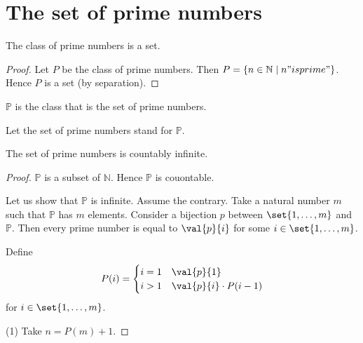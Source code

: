 \documentclass[../../basic-notions.ftl.tex]{subfiles}
\begin{document}


  \section{The set of prime numbers}

  \begin{forthel}
    \begin{lemma}
      The class of prime numbers is a set.
    \end{lemma}
    \begin{proof}
      Let $P$ be the class of prime numbers.
      Then $P = \{ n \in \mathbb{N} \mid n "is prime" \}$.
      Hence $P$ is a set (by separation).
    \end{proof}

    \begin{definition}
      $\mathbb{P}$ is the class that is the set of prime numbers.
    \end{definition}

    Let the set of prime numbers stand for $\mathbb{P}$.

    \begin{theorem}[Euclid]
      The set of prime numbers is countably infinite.
    \end{theorem}
    \begin{proof}
      $\mathbb{P}$ is a subset of $\mathbb{N}$.
      Hence $\mathbb{P}$ is couontable.

      Let us show that $\mathbb{P}$ is infinite.
        Assume the contrary.
        Take a natural number $m$ such that $\mathbb{P}$ has $m$ elements.
        Consider a bijection $p$ between $\set{1, \dots, m}$ and $\mathbb{P}$.
        Then every prime number is equal to $\val{p}{i}$ for some $i \in \set{1, \dots, m}$.

        Define $$P(i) =
          \begin{cases}
            i = 1 & \val{p}{1} \\
            i > 1 & \val{p}{i} \cdot P(i - 1)
          \end{cases}$$
        for $i \in \set{1, \dots, m}$.

        (1) Take $n = P(m) + 1$.


\end{proof}
\end{forthel}
\end{document}

